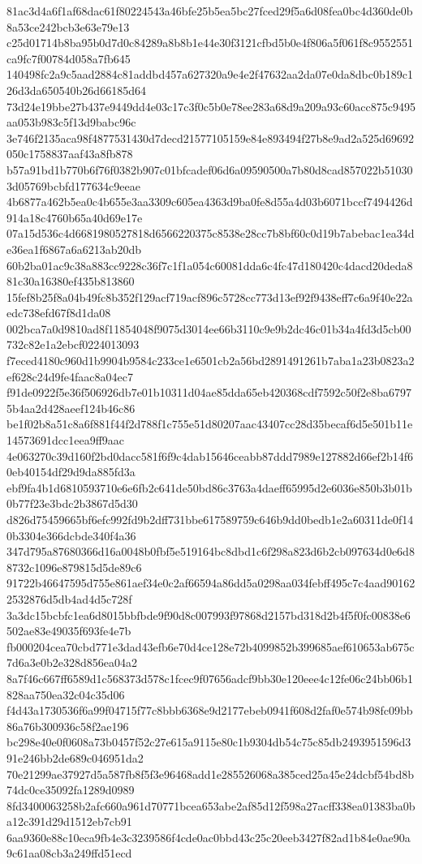 {81ac3d4a6f1af68dac61f80224543a46bfe25b5ea5bc27fced29f5a6d08fea0bc4d360de0b8a53ce242bcb3e63e79e13
c25d01714b8ba95b0d7d0c84289a8b8b1e44e30f3121cfbd5b0e4f806a5f061f8c9552551ca9fc7f00784d058a7fb645
140498fc2a9c5aad2884c81addbd457a627320a9e4e2f47632aa2da07e0da8dbc0b189c126d3da650540b26d66185d64
73d24e19bbe27b437e9449dd4e03c17c3f0c5b0e78ee283a68d9a209a93c60acc875c9495aa053b983c5f13d9babc96c
3e746f2135aca98f4877531430d7decd21577105159e84e893494f27b8e9ad2a525d69692050c1758837aaf43a8fb878
b57a91bd1b770b6f76f0382b907c01bfcadef06d6a09590500a7b80d8cad857022b510303d05769bcbfd177634c9eeae
4b6877a462b5ea0c4b655e3aa3309c605ea4363d9ba0fe8d55a4d03b6071bccf7494426d914a18c4760b65a40d69e17e
07a15d536c4d6681980527818d6566220375c8538e28cc7b8bf60c0d19b7abebac1ea34de36ea1f6867a6a6213ab20db
60b2ba01ac9c38a883cc9228c36f7c1f1a054c60081dda6c4fc47d180420c4dacd20deda881c30a16380ef435b813860
15fef8b25f8a04b49fc8b352f129acf719acf896c5728cc773d13ef92f9438eff7c6a9f40e22aedc738efd67f8d1da08
002bca7a0d9810ad8f11854048f9075d3014ee66b3110c9e9b2dc46c01b34a4fd3d5cb00732c82e1a2ebcf0224013093
f7eced4180c960d1b9904b9584c233ce1e6501cb2a56bd2891491261b7aba1a23b0823a2ef628c24d9fe4faac8a04ec7
f91de0922f5e36f506926db7e01b10311d04ae85dda65eb420368cdf7592c50f2e8ba67975b4aa2d428aeef124b46c86
be1f02b8a51c8a6f881f44f2d788f1c755e51d80207aac43407cc28d35becaf6d5e501b11e14573691dcc1eea9ff9aac
4e063270c39d160f2bd0dacc581f6f9c4dab15646ceabb87ddd7989e127882d66ef2b14f60eb40154df29d9da885fd3a
ebf9fa4b1d6810593710e6e6fb2c641de50bd86c3763a4daeff65995d2e6036e850b3b01b0b77f23e3bdc2b3867d5d30
d826d75459665bf6efc992fd9b2dff731bbe617589759c646b9dd0bedb1e2a60311de0f140b3304e366dcbde340f4a36
347d795a87680366d16a0048b0fbf5e519164bc8dbd1c6f298a823d6b2cb097634d0e6d88732c1096e879815d5de89c6
91722b46647595d755e861aef34e0c2af66594a86dd5a0298aa034febff495c7c4aad901622532876d5db4ad4d5c728f
3a3dc15bcbfc1ea6d8015bbfbde9f90d8c007993f97868d2157bd318d2b4f5f0fc00838e6502ae83e49035f693fe4e7b
fb000204cea70cbd771e3dad43efb6e70d4ce128e72b4099852b399685aef610653ab675c7d6a3e0b2e328d856ea04a2
8a7f46c667ff6589d1c568373d578c1fcec9f07656adcf9bb30e120eee4c12fe06c24bb06b1828aa750ea32c04c35d06
f4d43a1730536f6a99f04715f77c8bbb6368e9d2177ebeb0941f608d2faf0e574b98fc09bb86a76b300936c58f2ae196
bc298e40e0f0608a73b0457f52c27e615a9115e80c1b9304db54c75c85db2493951596d391e246bb2de689c046951da2
70e21299ae37927d5a587fb8f5f3e96468add1e285526068a385ced25a45e24dcbf54bd8b74dc0ce35092fa1289d0989
8fd3400063258b2afc660a961d70771bcea653abe2af85d12f598a27acff338ea01383ba0ba12c391d29d1512eb7cb91
6aa9360e88c10eca9fb4e3c3239586f4cde0ac0bbd43c25c20eeb3427f82ad1b84e0ae90a9c61aa08cb3a249ffd51ecd
}
